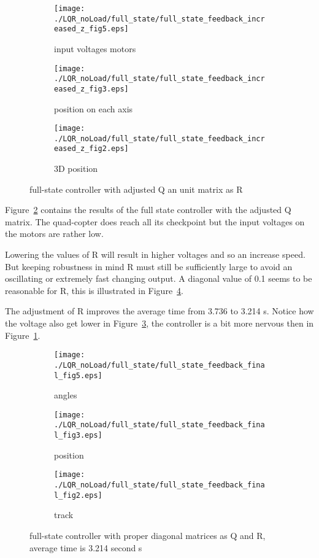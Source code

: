\begin{figure}[H]
	\centering
	\begin{subfigure}[b]{0.3\textwidth}
		\texttt{[image: ./LQR\_noLoad/full\_state/full\_state\_feedback\_increased\_z\_fig5.eps]}
		\caption{input voltages motors}
		\label{fig:full-state controller with low voltage}
	\end{subfigure}
	\begin{subfigure}[b]{0.3\textwidth}
		\texttt{[image: ./LQR\_noLoad/full\_state/full\_state\_feedback\_increased\_z\_fig3.eps]}
		\caption{position on each axis}
	\end{subfigure}
	\begin{subfigure}[b]{0.3\textwidth}
		\texttt{[image: ./LQR\_noLoad/full\_state/full\_state\_feedback\_increased\_z\_fig2.eps]}
		\caption{3D position}
	\end{subfigure}
	\caption{full-state controller with adjusted Q an unit matrix as R }\label{fig:full-state controller with adjusted Q matrix but a unit matrix as R}
\end{figure}

Figure~\ref{fig:full-state controller with adjusted Q matrix but a unit matrix as R} contains the results of the full state controller with the adjusted Q matrix. The quad-copter does reach all its checkpoint but the input voltages on the motors are rather low. 

Lowering the values of R  will result in higher voltages and so an increase speed. But keeping robustness in mind R must still be sufficiently large to avoid an oscillating or extremely fast changing output. A diagonal value of 0.1 seems to be reasonable for R, this is illustrated in Figure~\ref{fig:full-state controller with proper diagonal matrices as Q and R}.

The adjustment of R improves the average time from 3.736 to 3.214 s. Notice how the voltage also get lower in Figure~\ref{fig:full-state controller with proper diagonal matrices as Q and R - voltages}, the controller is a bit more nervous then in Figure~\ref{fig:full-state controller with low voltage}.
\begin{figure}[H]
	\centering
	\begin{subfigure}[b]{0.3\textwidth}
		\texttt{[image: ./LQR\_noLoad/full\_state/full\_state\_feedback\_final\_fig5.eps]}
		\caption{angles}
		\label{fig:full-state controller with proper diagonal matrices as Q and R - voltages}
	\end{subfigure}
	\begin{subfigure}[b]{0.3\textwidth}
		\texttt{[image: ./LQR\_noLoad/full\_state/full\_state\_feedback\_final\_fig3.eps]}
		\caption{position}
	\end{subfigure}
	\begin{subfigure}[b]{0.3\textwidth}
		\texttt{[image: ./LQR\_noLoad/full\_state/full\_state\_feedback\_final\_fig2.eps]}
		\caption{track}
	\end{subfigure}
	\caption{full-state controller with proper diagonal matrices as Q and R, average time is 3.214 second s}\label{fig:full-state controller with proper diagonal matrices as Q and R}
\end{figure}
